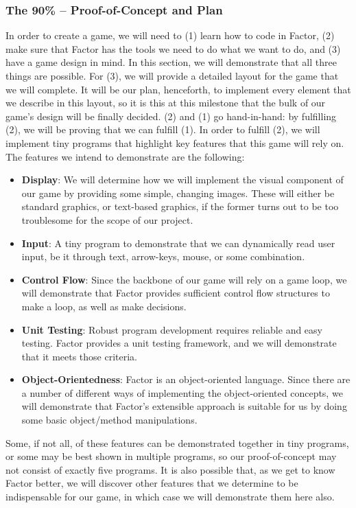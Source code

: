 \documentclass{sig-alternate}
\begin{document}
\subsubsection*{The 90\% -- Proof-of-Concept and Plan}
In order to create a game, we will need to (1) learn how to code in Factor, (2) make sure that Factor has the tools we need to do what we want to do, and (3) have a game design in mind. In this section, we will demonstrate that all three things are possible. For (3), we will provide a detailed layout for the game that we will complete. It will be our plan, henceforth, to implement every element that we describe in this layout, so it is this at this milestone that the bulk of our game's design will be finally decided. (2) and (1) go hand-in-hand: by fulfilling (2), we will be proving that we can fulfill (1).  In order to fulfill (2), we will implement tiny programs that highlight key features that this game will rely on. The features we intend to demonstrate are the following:
\begin{itemize}
\item \textbf{Display}: We will determine how we will implement the visual component of our game by providing some simple, changing images. These will either be standard graphics, or text-based graphics, if the former turns out to be too troublesome for the scope of our project.
\item \textbf{Input}: A tiny program to demonstrate that we can dynamically read user input, be it through text, arrow-keys, mouse, or some combination.
\item \textbf{Control Flow}: Since the backbone of our game will rely on a game loop, we will demonstrate that Factor provides sufficient control flow structures to make a loop, as well as make decisions.
\item \textbf{Unit Testing}: Robust program development requires reliable and easy testing. Factor provides a unit testing framework, and we will demonstrate that it meets those criteria.
\item \textbf{Object-Orientedness}: Factor is an object-oriented language. Since there are a number of different ways of implementing the object-oriented concepts, we will demonstrate that Factor's extensible approach is suitable for us by doing some basic object/method manipulations.
\end{itemize}
Some, if not all, of these features can be demonstrated together in tiny programs, or some may be best shown in multiple programs, so our proof-of-concept may not consist of exactly five programs. It is also possible that, as we get to know Factor better, we will discover other features that we determine to be indispensable for our game, in which case we will demonstrate them here also. 
\end{document}
